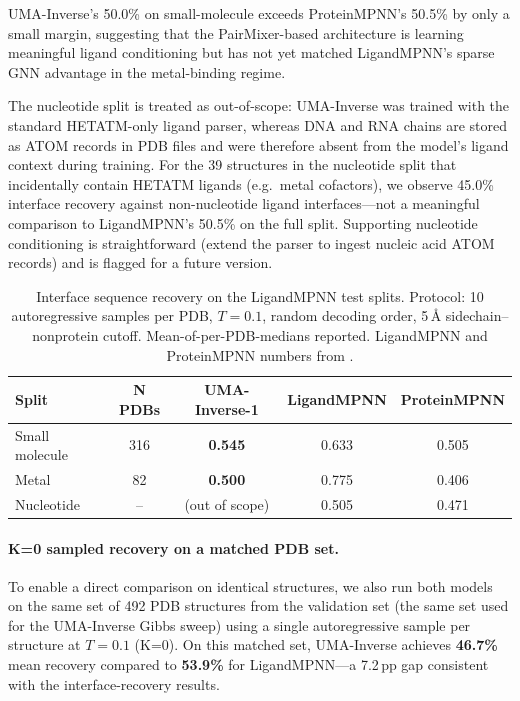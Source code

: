\documentclass[11pt,letterpaper]{article}
\begin{document}
UMA-Inverse's 50.0\% on small-molecule exceeds ProteinMPNN's 50.5\% by only a small margin,
suggesting that the PairMixer-based architecture is learning meaningful ligand conditioning but
has not yet matched LigandMPNN's sparse GNN advantage in the metal-binding regime.

The nucleotide split is treated as out-of-scope: UMA-Inverse was trained with the standard
HETATM-only ligand parser, whereas DNA and RNA chains are stored as ATOM records in PDB files and
were therefore absent from the model's ligand context during training. For the 39 structures in the
nucleotide split that incidentally contain HETATM ligands (e.g.\ metal cofactors), we observe
45.0\% interface recovery against non-nucleotide ligand interfaces---not a meaningful comparison
to LigandMPNN's 50.5\% on the full split. Supporting nucleotide conditioning is straightforward
(extend the parser to ingest nucleic acid ATOM records) and is flagged for a future version.

\begin{table}[h]
\centering
\caption{Interface sequence recovery on the LigandMPNN test splits. Protocol: 10 autoregressive
  samples per PDB, $T{=}0.1$, random decoding order, 5\,{\AA} sidechain--nonprotein cutoff.
  Mean-of-per-PDB-medians reported. LigandMPNN and ProteinMPNN numbers from
  \citet{dauparas2023atomic}.}
\label{tab:iface}
\begin{tabular}{lcccc}
\toprule
Split & N PDBs & UMA-Inverse-1 & LigandMPNN & ProteinMPNN \\
\midrule
Small molecule & 316 & \textbf{0.545} & 0.633 & 0.505 \\
Metal          & 82  & \textbf{0.500} & 0.775 & 0.406 \\
Nucleotide     & --  & (out of scope) & 0.505 & 0.471 \\
\bottomrule
\end{tabular}
\end{table}

\paragraph{K=0 sampled recovery on a matched PDB set.}
To enable a direct comparison on identical structures, we also run both models on the same set of
492 PDB structures from the validation set (the same set used for the UMA-Inverse Gibbs sweep)
using a single autoregressive sample per structure at $T{=}0.1$ (K=0). On this matched set,
UMA-Inverse achieves \textbf{46.7\%} mean recovery compared to \textbf{53.9\%} for LigandMPNN---a
7.2\,pp gap consistent with the interface-recovery results.
\end{document}

